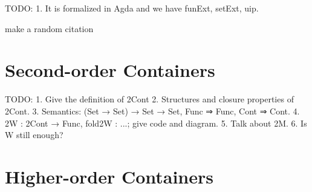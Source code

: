 \documentclass{easychair}
\begin{document}
TODO:
1. It is formalized in Agda and we have funExt, setExt, uip.

make a random citation\cite{bird1998nested}

\section{Second-order Containers}

TODO:
1. Give the definition of 2Cont
2. Structures and closure properties of 2Cont.
3. Semantics: (Set → Set) → Set → Set, Func ⇒ Func, Cont ⇒ Cont.
4. 2W : 2Cont → Func, fold2W : ...; give code and diagram.
5. Talk about 2M.
6. Is W still enough?

\section*{Higher-order Containers}




\end{document}
